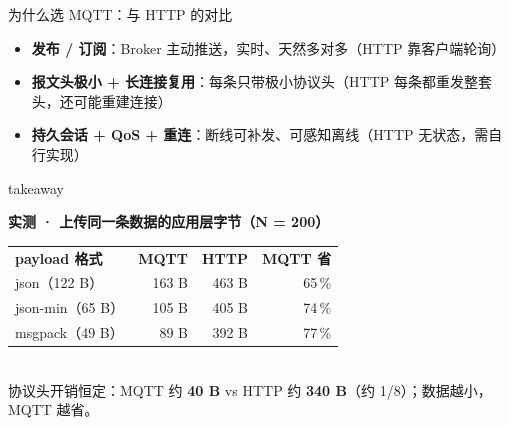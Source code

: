 \documentclass[aspectratio=169,10pt]{ctexbeamer}
\begin{document}
\begin{frame}{为什么选 MQTT：与 HTTP 的对比}
  \vspace{8pt}
  {\footnotesize
  \begin{itemize}\itemsep=8pt
    \item \textbf{发布 / 订阅}：Broker 主动推送，实时、天然多对多（HTTP 靠客户端轮询）
    \item \textbf{报文头极小 + 长连接复用}：每条只带极小协议头（HTTP 每条都重发整套头，还可能重建连接）
    \item \textbf{持久会话 + QoS + 重连}：断线可补发、可感知离线（HTTP 无状态，需自行实现）
  \end{itemize}}
  \vspace{2pt}
  \begin{beamercolorbox}[rounded=true, sep=7pt]{takeaway}
    \begin{center}
      {\footnotesize\textbf{实测 · 上传同一条数据的应用层字节（N = 200）}}\\[5pt]
      {\scriptsize
      \setlength{\tabcolsep}{9pt}\renewcommand{\arraystretch}{1.2}
      \begin{tabular}{@{}l r r r@{}}
        \textbf{payload 格式} & \textcolor{mLightBrown}{\textbf{MQTT}} & \textbf{HTTP} & \textbf{MQTT 省} \\
        json（122 B）    & 163 B & 463 B & 65\,\% \\
        json-min（65 B） & 105 B & 405 B & 74\,\% \\
        msgpack（49 B）  & 89 B  & 392 B & 77\,\% \\
      \end{tabular}}\\[5pt]
      {\footnotesize 协议头开销恒定：MQTT 约 \textbf{40 B} vs HTTP 约 \textbf{340 B}（约 1/8）；数据越小，MQTT 越省。}
    \end{center}
  \end{beamercolorbox}
\end{frame}
\end{document}
